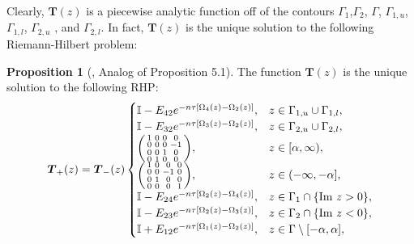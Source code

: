 \documentclass[usenames,dvipsnames]{article}
\theoremstyle{definition}
\newtheorem{prop}{Proposition}[section]
\numberwithin{equation}{section}
\numberwithin{figure}{section}
\begin{document}
Clearly, $\boldsymbol{T}(z)$ is a piecewise analytic function off of the contours $\Gamma_1 $,$\Gamma_2$, $\Gamma$, $\Gamma_{1,u}$, $\Gamma_{1,l}$, $\Gamma_{2,u}$ , 
and $\Gamma_{2,l}$. In fact, $\boldsymbol{T}(z)$ is the unique solution to the following Riemann-Hilbert problem:
    \begin{prop}[\cite{DHL1}, Analog of Proposition 5.1]
        The function $\boldsymbol{T}(z)$ is the unique solution to the following RHP:
            \begin{equation}\label{T-jumps}
                \boldsymbol{T}_{+}(z) = \boldsymbol{T}_{-}(z)
                \begin{cases}
                        \mathbb{I} - E_{42}e^{-n\tau[\Omega_4(z) - \Omega_2(z)]}, & z\in \Gamma_{1,u} \cup \Gamma_{1,l},\\
                       \mathbb{I} - E_{32}e^{-n\tau[\Omega_3(z) - \Omega_2(z)]}, & z\in \Gamma_{2,u} \cup \Gamma_{2,l},\\
                       \begin{psmallmatrix}
                            1 & 0 & 0 & 0\\
                            0 & 0 & 0 & -1\\
                            0 & 0 & 1 & 0\\
                            0 & 1 & 0 & 0
                        \end{psmallmatrix}, & z\in [\alpha,\infty),\\
                        \begin{psmallmatrix}
                            1 & 0 & 0 & 0\\
                            0 & 0 & -1 & 0\\
                            0 & 1 & 0 & 0\\
                            0 & 0 & 0 & 1
                        \end{psmallmatrix}, & z\in (-\infty,-\alpha],\\
                        \mathbb{I} - E_{24}e^{-n\tau[\Omega_2(z) - \Omega_4(z)]}, 
                        & z \in \Gamma_1 \cap \{\text{Im } z > 0\},\\
                        \mathbb{I} - E_{23}e^{-n\tau[\Omega_2(z) - \Omega_3(z)]}, 
                        & z \in \Gamma_2 \cap \{\text{Im } z < 0\},\\
                        \mathbb{I} + E_{12}e^{-n\tau[\Omega_1(z) - \Omega_2(z)]},
                        & z\in \Gamma \setminus [-\alpha,\alpha],\\

\end{cases}
\end{equation}
\end{prop}
\end{document}
